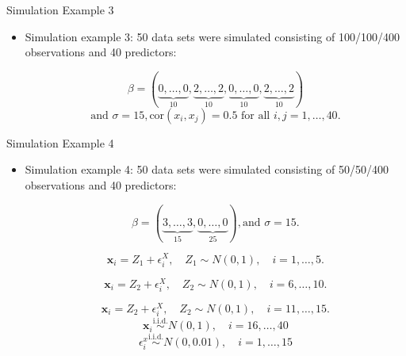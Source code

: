     \begin{frame}{Simulation Example 3}
        \begin{itemize}
            \item Simulation example 3: 50 data sets were simulated consisting of 100/100/400 observations and 40 predictors:
            
 $$\beta= ( \underbrace{0, \dots,0}_{10} ,\underbrace{2, \dots, 2}_{10}, \underbrace{0, \dots,0}_{10} ,\underbrace{2, \dots, 2}_{10}) $$ 
 $$ \text{and } \sigma= 15,  \text{cor}( x_i, x_j) = 0.5 \text{ for all }i,j=1,\dots,40.$$
        \end{itemize}
    \end{frame}


\begin{frame}{Simulation Example 4}
\begin{itemize}
            \item Simulation example 4: 50 data sets were simulated consisting of 50/50/400 observations and 40 predictors:

$$\beta= ( \underbrace{3, \dots, 3}_{15}, \underbrace{0, \dots, 0}_{25}) , \text{and }\sigma=15.$$

$$\mathbf{x}_{i}=Z_1+\epsilon_i^X,\quad Z_1\sim N(0,1),\quad i=1,\dots,5.$$

$$\mathbf{x}_{i}=Z_2+\epsilon_i^X,\quad Z_2\sim N(0,1),\quad i=6,\dots,10.$$

$$\mathbf{x}_{i}=Z_2+\epsilon_i^X,\quad Z_2\sim N(0,1),\quad i=11,\dots,15.$$
 $$\mathbf{x}_{i}\overset{\mathrm{i.i.d.}}{\operatorname*{\sim}}N(0,1),\quad i=16,\dots,40$$
 $$\epsilon_i^x\stackrel{\mathrm{i.i.d.}}{\sim}N(0,0.01),\quad i=1,\dots,15$$
            
        \end{itemize}
\end{frame}

